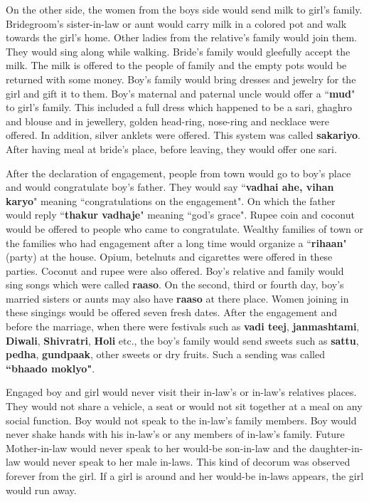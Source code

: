 On the other side, the women from the boys side would send milk to girl's
family. Bridegroom's sister-in-law or aunt would carry milk in a colored pot and
walk towards the girl's home. Other ladies from the relative's family would
join them. They would sing along while walking. Bride's family would gleefully
accept the milk. The milk is offered to the people of family and the empty
pots would be returned with some money. Boy's family would bring dresses and
jewelry for the girl and gift it to them. Boy's maternal and paternal uncle
would offer a ``\textbf{mud}" to girl's family. This included a full dress
which happened to be a sari, ghaghro and blouse and in jewellery, golden
head-ring, nose-ring and necklace were offered. In addition, silver anklets
were offered. This system was called \textbf{sakariyo}. After having meal at
bride's place, before leaving, they would offer one sari.

After the declaration of engagement, people from town would go to boy's place
and would congratulate boy's father. They would say ``\textbf{vadhai ahe,
vihan karyo}" meaning ``congratulations on the engagement". On which the father
would reply ``\textbf{thakur vadhaje}" meaning ``god's grace". Rupee coin and
coconut would be offered to people who came to congratulate. Wealthy families
of town or the families who had engagement after a long time would organize a
``\textbf{rihaan}" (party) at the house. Opium, betelnuts and cigarettes were
offered in these parties. Coconut and rupee were also offered. Boy's relative
and family would sing songs which were called \textbf{raaso}. On the second,
third or fourth day, boy's married sisters or aunts may also have
\textbf{raaso} at there place. Women joining in these singings would be offered
seven fresh dates. After the engagement and before the marriage, when there
were festivals such as \textbf{vadi teej}, \textbf{janmashtami},
\textbf{Diwali}, \textbf{Shivratri}, \textbf{Holi} etc., the boy's family
would send sweets such as \textbf{sattu}, \textbf{pedha}, \textbf{gundpaak},
other sweets or dry fruits. Such a sending was called \textbf{``bhaado moklyo"}.

Engaged boy and girl would never visit their in-law's or in-law's relatives
places. They would not share a vehicle, a seat or would not sit together at a
meal on any social function. Boy would not speak to the in-law's family
members. Boy would never shake hands with his in-law's or any members of
in-law's family. Future Mother-in-law would never speak to her would-be
son-in-law and the daughter-in-law would never speak to her male in-laws. This
kind of decorum was observed forever from the girl. If a girl is around and her
would-be in-laws appears, the girl would run away.

